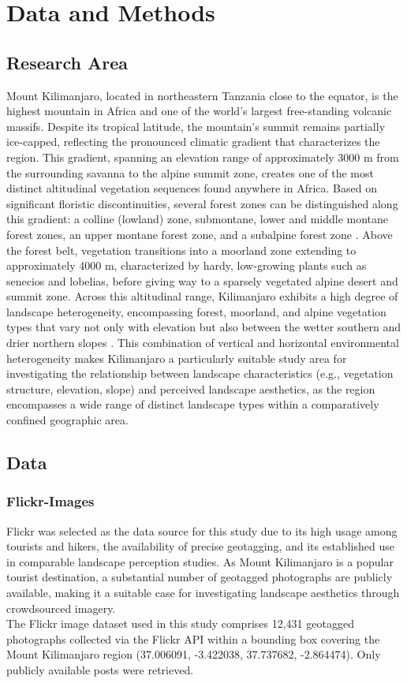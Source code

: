 \documentclass[hidelinks, 11pt]{article}
\begin{document}
\section{Data and Methods}\label{sec:Data and Methods}
\subsection{Research Area}
Mount Kilimanjaro, located in northeastern Tanzania close to the equator, is the highest mountain in Africa and one of the world's largest free-standing volcanic massifs. Despite its tropical latitude, the mountain's summit remains partially ice-capped, reflecting the pronounced climatic gradient that characterizes the region. This gradient, spanning an elevation range of approximately 3000 m from the surrounding savanna to the alpine summit zone, creates one of the most distinct altitudinal vegetation sequences found anywhere in Africa.
Based on significant floristic discontinuities, several forest zones can be distinguished along this gradient: a colline (lowland) zone, submontane, lower and middle montane forest zones, an upper montane forest zone, and a subalpine forest zone \citet{hemp_continuum_2006}. Above the forest belt, vegetation transitions into a moorland zone extending to approximately 4000 m, characterized by hardy, low-growing plants such as senecios and lobelias, before giving way to a sparsely vegetated alpine desert and summit zone.
Across this altitudinal range, Kilimanjaro exhibits a high degree of landscape heterogeneity, encompassing forest, moorland, and alpine vegetation types that vary not only with elevation but also between the wetter southern and drier northern slopes \citet{hemp_continuum_2006}. This combination of vertical and horizontal environmental heterogeneity makes Kilimanjaro a particularly suitable study area for investigating the relationship between landscape characteristics (e.g., vegetation structure, elevation, slope) and perceived landscape aesthetics, as the region encompasses a wide range of distinct landscape types within a comparatively confined geographic area.
\subsection{Data}

\subsubsection{Flickr-Images}

Flickr was selected as the data source for this study due to its high usage among tourists and hikers, the availability of precise geotagging, and its established use in comparable landscape perception studies. As Mount Kilimanjaro is a popular tourist destination, a substantial number of geotagged photographs 
are publicly available, making it a suitable case for investigating landscape aesthetics through crowdsourced imagery.
\\
The Flickr image dataset used in this study comprises 12{,}431 geotagged photographs collected via the Flickr API within a bounding box covering the Mount Kilimanjaro region (37.006091, -3.422038, 37.737682, -2.864474). Only publicly available posts were retrieved.
\end{document}
